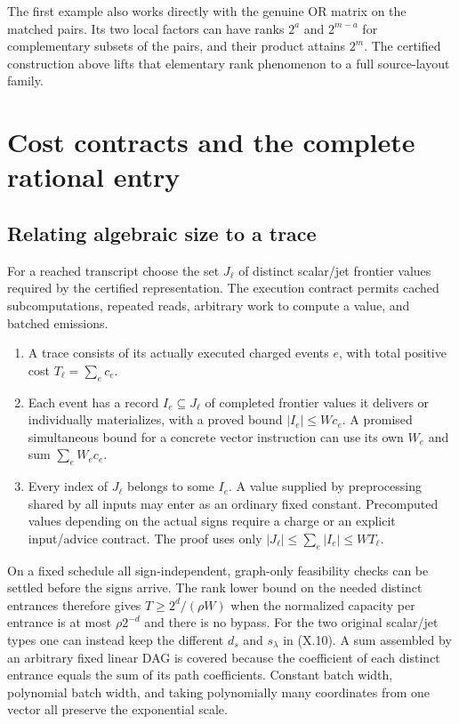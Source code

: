 \documentclass[
  11pt,
]{article}
\providecommand{\tightlist}{%
  \setlength{\itemsep}{0pt}\setlength{\parskip}{0pt}}
\begin{document}
The first example also works directly with the genuine OR matrix on the
matched pairs. Its two local factors can have ranks \(2^a\) and
\(2^{m-a}\) for complementary subsets of the pairs, and their product
attains \(2^m\). The certified construction above lifts that elementary
rank phenomenon to a full source-layout family.

\section{Cost contracts and the complete rational
entry}\label{cost-contracts-and-the-complete-rational-entry}

\subsection{Relating algebraic size to a
trace}\label{relating-algebraic-size-to-a-trace}

For a reached transcript choose the set \(J_\ell\) of distinct
scalar/jet frontier values required by the certified representation. The
execution contract permits cached subcomputations, repeated reads,
arbitrary work to compute a value, and batched emissions.

\begin{enumerate}
\def\labelenumi{\arabic{enumi}.}
\tightlist
\item
  A trace consists of its actually executed charged events \(e\), with
  total positive cost \(T_\ell=\sum_e c_e\).
\item
  Each event has a record \(I_e\subseteq J_\ell\) of completed frontier
  values it delivers or individually materializes, with a proved bound
  \(|I_e|\le Wc_e\). A promised simultaneous bound for a concrete vector
  instruction can use its own \(W_e\) and sum \(\sum_e W_ec_e\).
\item
  Every index of \(J_\ell\) belongs to some \(I_e\). A value supplied by
  preprocessing shared by all inputs may enter as an ordinary fixed
  constant. Precomputed values depending on the actual signs require a
  charge or an explicit input/advice contract. The proof uses only
  \(|J_\ell|\le\sum_e |I_e|\le WT_\ell\).
\end{enumerate}

On a fixed schedule all sign-independent, graph-only feasibility checks
can be settled before the signs arrive. The rank lower bound on the
needed distinct entrances therefore gives \(T\ge2^d/(\rho W)\) when the
normalized capacity per entrance is at most \(\rho 2^{-d}\) and there is
no bypass. For the two original scalar/jet types one can instead keep
the different \(d_s\) and \(s_\lambda\) in (X.10). A sum assembled by an
arbitrary fixed linear DAG is covered because the coefficient of each
distinct entrance equals the sum of its path coefficients. Constant
batch width, polynomial batch width, and taking polynomially many
coordinates from one vector all preserve the exponential scale.
\end{document}
